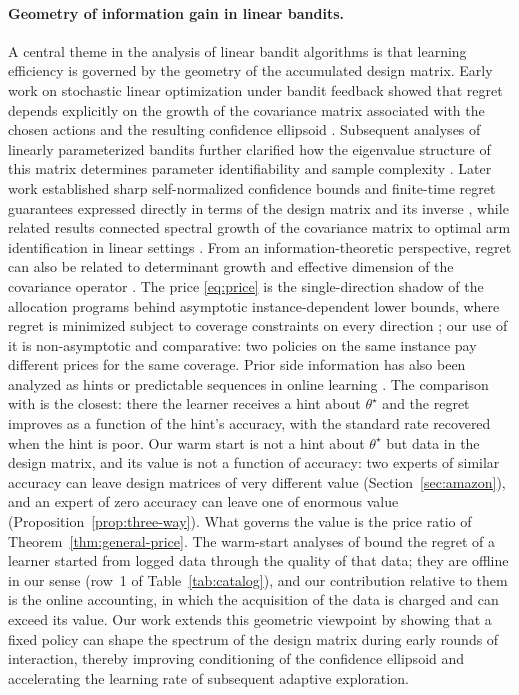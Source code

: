 \documentclass[anon]{alt2027} %
\begin{document}
\paragraph{Geometry of information gain in linear bandits.}
A central theme in the analysis of linear bandit algorithms is that learning
efficiency is governed by the geometry of the accumulated design matrix.
Early work on stochastic linear optimization under bandit feedback showed
that regret depends explicitly on the growth of the covariance matrix
associated with the chosen actions and the resulting confidence ellipsoid
\citep{dani2008stochastic}. Subsequent analyses of linearly parameterized
bandits further clarified how the eigenvalue structure of this matrix
determines parameter identifiability and sample complexity
\citep{rusmevichientong2010linearly}. Later work established sharp
self-normalized confidence bounds and finite-time regret guarantees
expressed directly in terms of the design matrix and its inverse
\citep{abbasi2011improved}, while related results connected spectral growth
of the covariance matrix to optimal arm identification in linear settings
\citep{soare2014best}. From an information-theoretic perspective, regret can
also be related to determinant growth and effective dimension of the
covariance operator \citep{srinivas2012information,valko2013finite}. The
price \eqref{eq:price} is the single-direction shadow of the allocation
programs behind asymptotic instance-dependent lower bounds, where regret is
minimized subject to coverage constraints on every direction
\citep{graves1997asymptotically,lattimore2017end}; our use of it is
non-asymptotic and comparative: two policies on the same instance pay
different prices for the same coverage. Prior side information has also been
analyzed as hints or predictable sequences in online learning
\citep{rakhlin2013online,cutkosky2022leveraging}. The comparison with
\citet{cutkosky2022leveraging} is the closest: there the learner receives a
hint about $\theta^\star$ and the regret improves as a function of the hint's
accuracy, with the standard rate recovered when the hint is poor. Our warm
start is not a hint about $\theta^\star$ but data in the design matrix, and
its value is not a function of accuracy: two experts of similar accuracy can
leave design matrices of very different value (Section~\ref{sec:amazon}),
and an expert of zero accuracy can leave one of enormous value
(Proposition~\ref{prop:three-way}). What governs the value is the price ratio
of Theorem~\ref{thm:general-price}. The warm-start analyses of
\citet{bastani2021mostly,zhang2019warm} bound the regret of a learner started
from logged data through the quality of that data; they are offline in our
sense (row~1 of Table~\ref{tab:catalog}), and our contribution relative to
them is the online accounting, in which the acquisition of the data is
charged and can exceed its value. Our
work extends this geometric viewpoint by showing that a fixed policy can
shape the spectrum of the design matrix during early rounds of interaction,
thereby improving conditioning of the confidence ellipsoid and accelerating
the learning rate of subsequent adaptive exploration.
\end{document}
